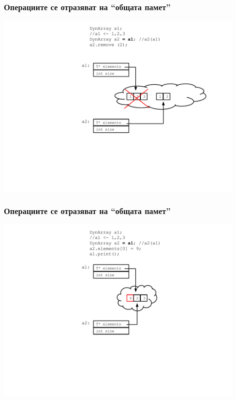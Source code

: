 \documentclass{beamer}
\begin{document}
\begin{frame}[fragile]
\frametitle{Операциите се отразяват на ``общата памет''}
\includegraphics[width=12.5cm]{images/memshare_03}
\end{frame}

\begin{frame}[fragile]
\frametitle{Операциите се отразяват на ``общата памет''}
\includegraphics[width=12.5cm]{images/memshare_04}
\end{frame}
\end{document}
